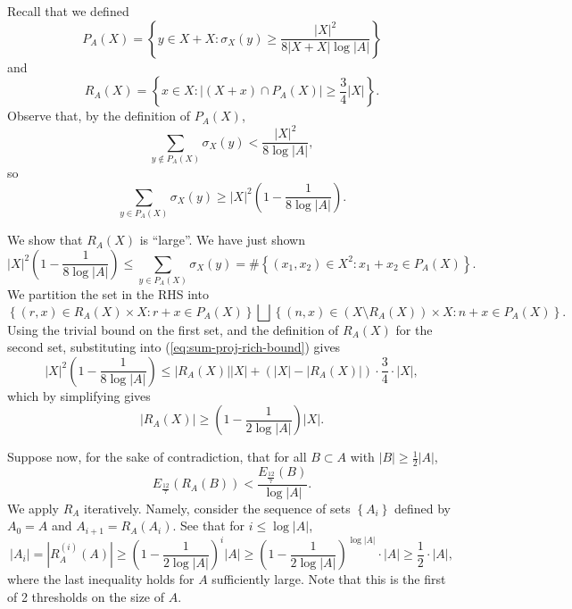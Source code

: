 \documentclass[reqno]{amsart}
\numberwithin{equation}{section}
\begin{document}
Recall that we defined
\[
P_{A} (X) = \left\{ y \in X + X : \sigma_{X} (y) \geq \frac{\left\lvert X \right\rvert ^{2}}{8  \left\lvert X+X \right\rvert \log \left\lvert A \right\rvert }  \right\} 
\]
and
\[
    R_{A} (X) = \left\{ x \in X : \left\lvert \left( X + x \right) \cap P_{A} (X) \right\rvert \geq \frac{3}{4}  \left\lvert X \right\rvert  \right\} 
.\]
Observe that, by the definition of \(P_{A} (X)\),
\[
    \sum _{y \not \in P_{A} (X)} \sigma_{X} (y) < \frac{\left\lvert X \right\rvert ^{2}}{8 \log \left\lvert A \right\rvert } 
,\]
so
\[
    \sum _{y \in P_{A} (X)} \sigma_{X} (y) \geq \left\lvert X \right\rvert ^{2} \left( 1 - \frac{1}{8 \log \left\lvert A \right\rvert }  \right)
.\]

We show that \(R_{A} (X)\) is ``large''. We have just shown
\begin{equation} \label{eq:sum-proj-rich-bound}
    \left\lvert X \right\rvert ^{2} \left( 1 - \frac{1}{8 \log \left\lvert A \right\rvert }  \right)  \leq \sum _{y \in P_{A} (X)} \sigma_{X} (y) = \# \left\{ (x_1,x_2) \in X^{2}: x_1+x_2 \in P_{A} (X) \right\}.
\end{equation}
We partition the set in the RHS into
\[
    \left\{ (r,x)\in R_{A} (X) \times X : r+x \in P_{A} (X)  \right\} \bigsqcup  \left\{ (n,x) \in \left( X \setminus R_{A} (X) \right) \times X : n + x \in P_{A} (X)\right\} 
.\]
Using the trivial bound on the first set, and the definition of \(R_{A} (X)\) for the second set,
substituting into (\ref{eq:sum-proj-rich-bound}) gives
\[
   \left\lvert X \right\rvert ^{2} \left( 1 - \frac{1}{8 \log \left\lvert A \right\rvert }  \right)  \leq \left\lvert R_{A} (X) \right\rvert \left\lvert X \right\rvert + \left( \left\lvert X \right\rvert - \left\lvert R_{A} (X) \right\rvert  \right) \cdot \frac{3}{4} \cdot  \left\lvert X \right\rvert,
\]
which by simplifying gives
\[
    \left\lvert R_{A} (X) \right\rvert \geq \left( 1 - \frac{1}{2 \log \left\lvert A \right\rvert }  \right) \left\lvert X \right\rvert 
.\]

Suppose now, for the sake of contradiction, that for all \(B \subset A\) with \(\left\lvert B \right\rvert \geq \frac{1}{2} \left\lvert A \right\rvert \),
\[
    E_{\frac{12}{7} } \left( R_{A} (B) \right) < \frac{E_{\frac{12}{7} } (B)}{\log \left\lvert A \right\rvert } 
.\]
We apply \(R_{A} \) iteratively. Namely, consider the sequence of sets \(\left\{ A_{i}  \right\} \) defined by \(A_{0} = A\) and \(A_{i+1} = R_{A} (A_{i} )\).
See that for \(i \leq \log \left\lvert A \right\rvert \),
\[
    \left\lvert A_{i} \right\rvert  = \left\lvert R_{A} ^{(i)}(A) \right\rvert \geq \left( 1 - \frac{1}{2 \log \left\lvert A \right\rvert }  \right) ^{i} \left\lvert A \right\rvert \geq \left( 1 - \frac{1}{2 \log \left\lvert A \right\rvert }  \right) ^{\log \left\lvert A \right\rvert } \cdot \left\lvert A \right\rvert \geq \frac{1}{2} \cdot \left\lvert A \right\rvert 
,\]
where the last inequality holds for \(A\) sufficiently large. Note that this is the
first of 2 thresholds on the size of \(A\).
\end{document}
